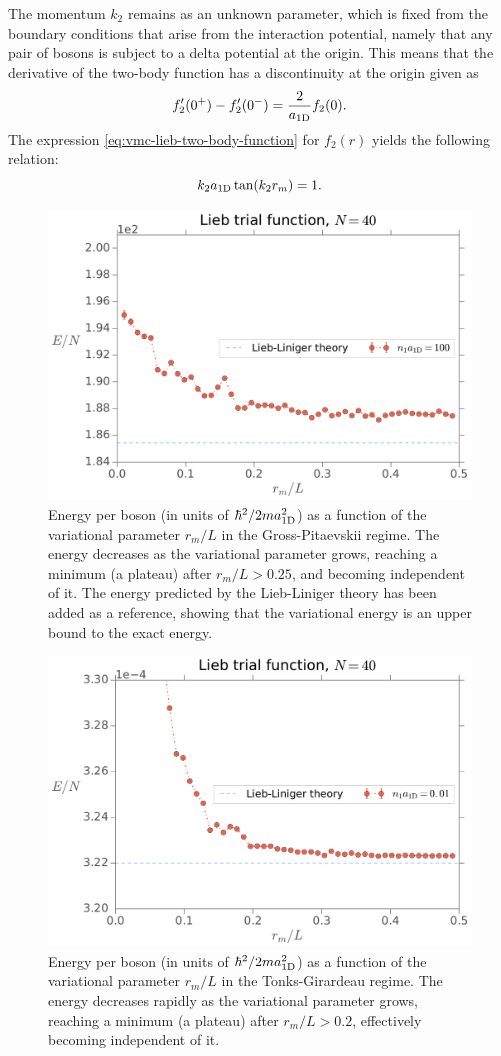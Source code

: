 The momentum $k_2$ remains as an unknown parameter, which is fixed from the
boundary conditions that arise from the interaction potential, namely that any
pair of bosons is subject to a delta potential at the origin. This means that
the derivative of the two-body function has a discontinuity at the origin given
as
%
\begin{equation}
	f_2'(0^{+}) - f_2'(0^{-}) = \frac{2}{a_{ \mathrm{1D} }} f_2(0).
\end{equation}
%
The expression \eqref{eq:vmc-lieb-two-body-function} for $f_2(r)$ yields the
following relation:
%
\begin{equation}
	k_2 a_{ \mathrm{1D} } \tan(k_2 r_m) = 1.
\end{equation}
%
\begin{figure}[t!]
	\centering
	\includegraphics[width=0.75\linewidth]{./figures/lieb_energy-as-rm_n-a1d-100_Nb-40}
	\caption{ Energy per boson (in units of $\hbar^2/2ma_{ \mathrm{1D} }^2$) as a function
		of the variational parameter $r_m / L$ in the Gross-Pitaevskii regime. The
		energy decreases as the variational parameter grows, reaching a minimum (a
		plateau) after $r_m / L > 0.25$, and becoming independent of it. The energy
		predicted by the Lieb-Liniger theory has been added as a reference, showing
		that the variational energy is an upper bound to the exact energy. }
	\label{fig:lieb-energy-as-rm-n-a1d-100-nb-40}
\end{figure}
%
\begin{figure}[h!]
	\centering
	\includegraphics[width=0.75\linewidth]{./figures/lieb_energy-as-rm_n-a1d-0-dot-01_Nb-40}
	\caption{ Energy per boson (in units of $\hbar^2/2ma_{ \mathrm{1D} }^2$) as a function
		of the variational parameter $r_m / L$ in the Tonks-Girardeau regime. The
		energy decreases rapidly as the variational parameter grows, reaching a
		minimum (a plateau) after $r_m / L > 0.2$, effectively becoming independent
		of it. }
	\label{fig:lieb-energy-as-rm-n-a1d-0-dot-01-nb-40}
\end{figure}
